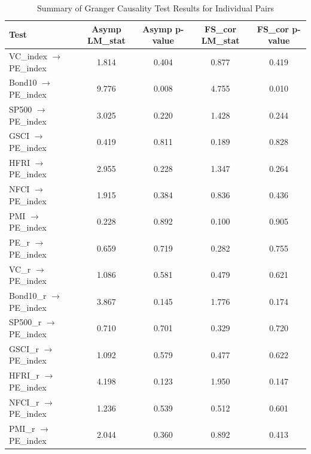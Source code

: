 \documentclass[11pt]{article}
\begin{document}
\begin{table}[H]
\centering
\caption{Summary of Granger Causality Test Results for Individual Pairs}
\label{tab:granger_results_pairs}
\begin{tabular}{|l|c|c|c|c|}
\hline
\textbf{Test} & \textbf{Asymp LM\_stat} & \textbf{Asymp p-value} & \textbf{FS\_cor LM\_stat} & \textbf{FS\_cor p-value} \\ \hline
VC\_index $\rightarrow$ PE\_index & 1.814 & 0.404 & 0.877 & 0.419 \\ \hline
Bond10 $\rightarrow$ PE\_index & 9.776 & 0.008 & 4.755 & 0.010 \\ \hline
SP500 $\rightarrow$ PE\_index & 3.025 & 0.220 & 1.428 & 0.244 \\ \hline
GSCI $\rightarrow$ PE\_index & 0.419 & 0.811 & 0.189 & 0.828 \\ \hline
HFRI $\rightarrow$ PE\_index & 2.955 & 0.228 & 1.347 & 0.264 \\ \hline
NFCI $\rightarrow$ PE\_index & 1.915 & 0.384 & 0.836 & 0.436 \\ \hline
PMI $\rightarrow$ PE\_index & 0.228 & 0.892 & 0.100 & 0.905 \\ \hline
PE\_r $\rightarrow$ PE\_index & 0.659 & 0.719 & 0.282 & 0.755 \\ \hline
VC\_r $\rightarrow$ PE\_index & 1.086 & 0.581 & 0.479 & 0.621 \\ \hline
Bond10\_r $\rightarrow$ PE\_index & 3.867 & 0.145 & 1.776 & 0.174 \\ \hline
SP500\_r $\rightarrow$ PE\_index & 0.710 & 0.701 & 0.329 & 0.720 \\ \hline
GSCI\_r $\rightarrow$ PE\_index & 1.092 & 0.579 & 0.477 & 0.622 \\ \hline
HFRI\_r $\rightarrow$ PE\_index & 4.198 & 0.123 & 1.950 & 0.147 \\ \hline
NFCI\_r $\rightarrow$ PE\_index & 1.236 & 0.539 & 0.512 & 0.601 \\ \hline
PMI\_r $\rightarrow$ PE\_index & 2.044 & 0.360 & 0.892 & 0.413 \\ \hline
\end{tabular}
\end{table}
\end{document}
